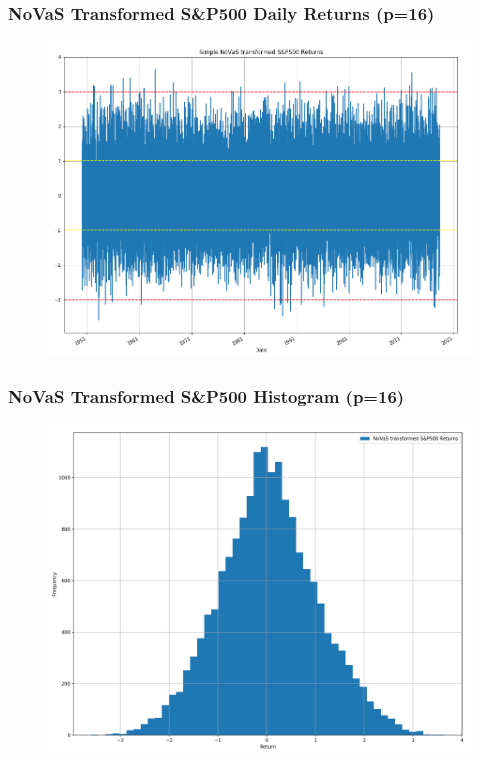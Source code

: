 \documentclass{beamer}
\begin{document}
\begin{frame}
\frametitle{NoVaS Transformed S&P500 Daily Returns (p=16)}
\begin{figure}[h!]
\centering 
\includegraphics[width=\textwidth]{novas_sp500_returns.png}
\end{figure}
\end{frame}

\begin{frame}
\frametitle{NoVaS Transformed S&P500 Histogram (p=16)}
\begin{figure}[h!]
\includegraphics[width=\textwidth]{novas_sp500_returns_hist.png}
\end{figure}
\end{frame}
\end{document}
